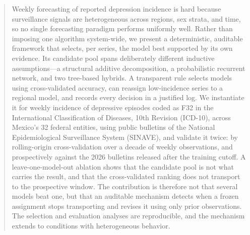 \documentclass[runningheads]{llncs}
\begin{document}

\maketitle

\begin{abstract}
Weekly forecasting of reported depression incidence is hard because surveillance
signals are heterogeneous across regions, sex strata, and time, so no single
forecasting paradigm performs uniformly well. Rather than imposing one
algorithm system-wide, we present a deterministic, auditable framework
that selects, per series, the model best supported by its own evidence.
Its candidate pool spans deliberately different inductive
assumptions---a structural additive decomposition, a probabilistic
recurrent network, and two tree-based hybrids. A transparent rule selects
models using cross-validated accuracy, can reassign low-incidence series
to a regional model, and records every decision in a justified log. We instantiate it for weekly
incidence of depressive episodes coded as F32 in the International
Classification of Diseases, 10th Revision (\mbox{ICD-10}), across Mexico's 32
federal entities, using public bulletins of the National Epidemiological
Surveillance System (SINAVE),
and validate it twice: by rolling-origin cross-validation over a decade of
weekly observations, and prospectively against the 2026 bulletins released
after the training cutoff. A leave-one-model-out
ablation shows that the candidate pool is not what carries the result, and
that the cross-validated ranking does not transport to the prospective
window. The contribution is therefore not that several models beat one,
but that an auditable mechanism detects when a frozen assignment stops
transporting and revises it using only prior observations. The selection
and evaluation analyses are reproducible, and the mechanism extends to
conditions with heterogeneous behavior.

\end{abstract}

\end{document}
